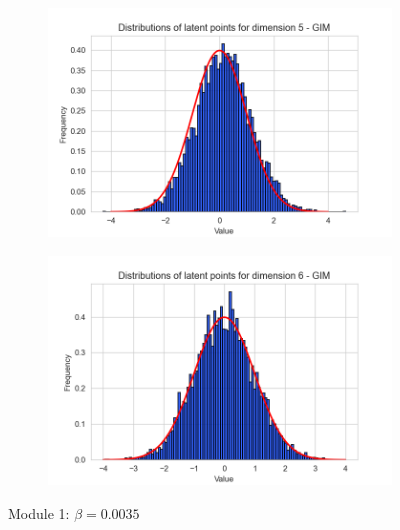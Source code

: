 \begin{figure}[h]
\begin{subfigure}[b]{0.25\textwidth}
	\end{subfigure}
	\hfill
	\begin{subfigure}[b]{0.25\textwidth}
		\centering
		\includegraphics[width=1\linewidth]{"graphs/distr/module1 kld0035/_ distribution_latent_space_GIM_dim=4"}
	\end{subfigure}
	\hfill
	\begin{subfigure}[b]{0.25\textwidth}
		\centering
		\includegraphics[width=1\linewidth]{"graphs/distr/module1 kld0035/_ distribution_latent_space_GIM_dim=5"}
	\end{subfigure}
	\caption{Module 1: $\beta=0.0035$}
\end{figure}
